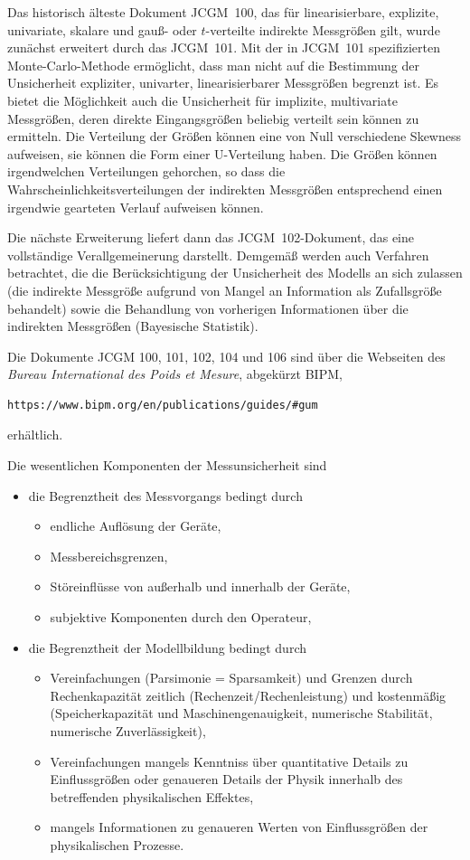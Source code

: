 Das historisch älteste Dokument JCGM~100, das für linearisierbare, explizite, univariate, skalare und
gauß- oder $t$-verteilte indirekte Messgrößen gilt, wurde zunächst erweitert durch das JCGM~101. Mit der
in JCGM~101 spezifizierten Monte-Carlo-Methode ermöglicht, dass man nicht auf die Bestimmung der Unsicherheit
expliziter, univarter, linearisierbarer Messgrößen begrenzt ist.
Es bietet die Möglichkeit auch die Unsicherheit für implizite, multivariate Messgrößen,
deren direkte Eingangsgrößen beliebig verteilt sein können zu ermitteln. Die Verteilung der
Größen können eine von Null verschiedene Skewness aufweisen, sie können die Form einer
U-Verteilung haben. Die Größen können irgendwelchen Verteilungen gehorchen, so dass die
Wahrscheinlichkeitsverteilungen der indirekten Messgrößen entsprechend einen
irgendwie gearteten Verlauf aufweisen können.

Die nächste Erweiterung liefert dann das JCGM~102-Dokument, das eine vollständige Verallgemeinerung
darstellt. Demgemäß werden auch Verfahren betrachtet, die die Berücksichtigung der Unsicherheit des Modells an sich
zulassen (die indirekte Messgröße aufgrund von Mangel an Information als Zufallsgröße behandelt)
sowie die Behandlung von vorherigen Informationen über die indirekten Messgrößen (Bayesische Statistik).

Die Dokumente JCGM 100, 101, 102, 104 und 106 sind über die Webseiten des
\textsl{Bureau International des Poids et Mesure}, abgekürzt BIPM,
\begin{verbatim}
https://www.bipm.org/en/publications/guides/#gum
\end{verbatim}
erhältlich.

Die wesentlichen Komponenten der Messunsicherheit sind
\begin{itemize}
\item die Begrenztheit des Messvorgangs bedingt durch
  \begin{itemize}
  \item endliche Auflösung der Geräte,
  \item Messbereichsgrenzen,
  \item Störeinflüsse von außerhalb und innerhalb der Geräte,
  \item subjektive Komponenten durch den Operateur,
  \end{itemize}
\item die Begrenztheit der Modellbildung bedingt durch
  \begin{itemize}
  \item Vereinfachungen (Parsimonie = \glqq Sparsamkeit\grqq)
    und Grenzen durch Rechenkapazität zeitlich (Rechenzeit/Rechenleistung)
    und kostenmäßig (Speicherkapazität und Maschinengenauigkeit,
    numerische Stabilität, numerische Zuverlässigkeit),
  \item Vereinfachungen mangels Kenntniss über quantitative Details
    zu Einflussgrößen
    oder genaueren Details der Physik innerhalb des
    betreffenden physikalischen Effektes,
  \item mangels Informationen zu genaueren Werten von Einflussgrößen der
    physikalischen Prozesse.
  \end{itemize}
\end{itemize}

